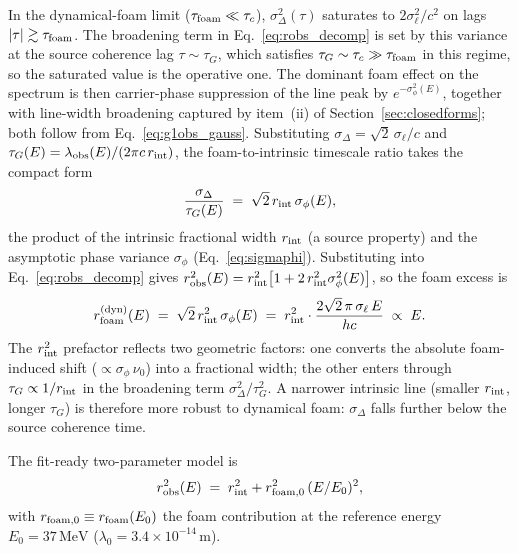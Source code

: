 \documentclass[aps,prd,onecolumn,amsmath,amssymb]{revtex4-2}
\begin{document}
In the dynamical-foam limit ($\tau_{\rm foam}\ll\tau_c$),
$\sigma_\Delta^2(\tau)$ saturates to $2\sigma_\ell^2/c^2$ on lags
$|\tau|\gtrsim\tau_{\rm foam}$.  The broadening term in
Eq.~\eqref{eq:robs_decomp} is set by this variance at the source
coherence lag $\tau\sim\tau_G$, which satisfies
$\tau_G\sim\tau_c\gg\tau_{\rm foam}$ in this regime, so the saturated
value is the operative one.
The dominant foam effect on the spectrum is then carrier-phase
suppression of the line peak by $e^{-\sigma_\phi^2(E)}$, together with
line-width broadening captured by item~(ii) of
Section~\ref{sec:closedforms}; both follow from
Eq.~\eqref{eq:g1obs_gauss}.  Substituting
$\sigma_\Delta=\sqrt{2}\,\sigma_\ell/c$ and
$\tau_G(E)=\lambda_{\rm obs}(E)/(2\pi c\,r_{\rm int})$, the
foam-to-intrinsic timescale ratio takes the compact form
\begin{equation}
  \frac{\sigma_\Delta}{\tau_G(E)}
  \;=\; \sqrt{2}\,r_{\rm int}\,\sigma_\phi(E),
  \label{eq:sigmaDelta_tauG_dyn}
\end{equation}
the product of the intrinsic fractional width $r_{\rm int}$
(a source property) and the asymptotic phase variance
$\sigma_\phi$ (Eq.~\eqref{eq:sigmaphi}).  Substituting into
Eq.~\eqref{eq:robs_decomp} gives
$r_{\rm obs}^2(E) = r_{\rm int}^2\bigl[1+2\,r_{\rm int}^2\sigma_\phi^2(E)\bigr]$,
so the foam excess is
\begin{equation}
  r_{\rm foam}^{\rm (dyn)}(E)
  \;=\; \sqrt{2}\,r_{\rm int}^2\,\sigma_\phi(E)
  \;=\; r_{\rm int}^2\cdot\frac{2\sqrt{2}\,\pi\,\sigma_\ell\,E}{hc}
  \;\propto\; E.
  \label{eq:rfoam_dyn}
\end{equation}
The $r_{\rm int}^2$ prefactor reflects two geometric factors: one
converts the absolute foam-induced shift ($\propto\sigma_\phi\,\nu_0$)
into a fractional width; the other enters through
$\tau_G\propto 1/r_{\rm int}$ in the broadening term
$\sigma_\Delta^2/\tau_G^2$.  A narrower intrinsic line (smaller
$r_{\rm int}$, longer $\tau_G$) is therefore more robust to dynamical
foam: $\sigma_\Delta$ falls further below the source coherence time.

The fit-ready two-parameter model is
\begin{equation}
  r_{\rm obs}^2(E) \;=\; r_{\rm int}^2 + r_{\rm foam,0}^2\,(E/E_0)^2,
  \label{eq:robs_model}
\end{equation}
with $r_{\rm foam,0}\equiv r_{\rm foam}(E_0)$ the foam contribution at
the reference energy $E_0 = 37\,\mathrm{MeV}$
($\lambda_0 = 3.4\times10^{-14}\,\mathrm{m}$).
\end{document}
